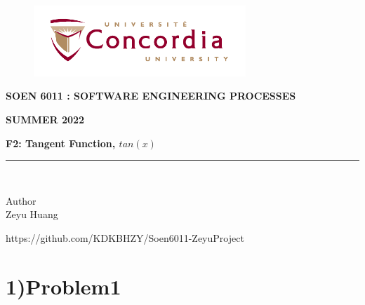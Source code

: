 \documentclass[letterpaper, 11pt]{report}
\begin{document}
\begin{titlepage}
\vspace*{0.7in}
\begin{center}
\begin{figure}[htb]
\begin{center}
\includegraphics[width=8cm]{univ_logo}
\end{center}
\end{figure}
\vspace*{0.3in}
\begin{Large}
\textbf{SOEN 6011 : SOFTWARE ENGINEERING PROCESSES} \\
\end{Large}
\vspace*{0.1in}
\begin{Large}
\textbf{SUMMER 2022} \\
\end{Large}
\vspace*{0.9in}
\begin{Large}
\textbf{F2: Tangent Function, $tan(x)$} \\
\end{Large}
\vspace*{0.625in}
\rule{80mm}{0.1mm}\\
\vspace*{0.1in}
\begin{large}
Author \\
\vspace*{0.1in}
Zeyu Huang\\

\vspace*{0.3in}
\date{\normalsize\today} 
\end{large}
\end{center}
\begin{center}
https://github.com/KDKBHZY/Soen6011-ZeyuProject\end{center}
\end{titlepage}
\tableofcontents
\newpage
{}
\section*{1)Problem1}
\end{document}
